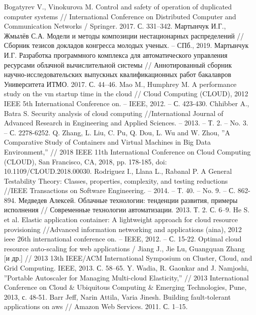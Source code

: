 \begin{thebibliography}{40}
Bogatyrev V., Vinokurova M. Control and safety of operation of duplicated computer systems // International Conference on Distributed Computer and Communication Networks / Springer. 2017. С. 331–342.
Мартынчук И.Г., Жмылёв С.А. Модели и методы композиции нестационарных распределений // Сборник тезисов докладов конгресса молодых ученых. – СПб., 2019.
Мартынчук И.Г. Разработка программного комплекса для автоматического управления ресурсами облачной вычислительной системы // Аннотированный сборник научно-исследовательских выпускных квалификационных работ бакалавров Университета ИТМО. 2017. С. 44–46.
Mao M., Humphrey M. A performance study on the vm startup time in the cloud // Cloud Computing (CLOUD), 2012 IEEE 5th International Conference on. – IEEE, 2012. – С. 423-430.
Chhibber A., Batra S. Security analysis of cloud computing //International Journal of Advanced Research in Engineering and Applied Sciences. – 2013. – Т. 2. – No. 3. – С. 2278-6252.
Q. Zhang, L. Liu, C. Pu, Q. Dou, L. Wu and W. Zhou, ''A Comparative Study of Containers and Virtual Machines in Big Data Environment,'' // 2018 IEEE 11th International Conference on Cloud Computing (CLOUD), San Francisco, CA, 2018, pp. 178-185, doi: 10.1109/CLOUD.2018.00030.
Rodriguez I., Llana L., Rabanal P. A General Testability Theory: Classes, properties, complexity, and testing reductions //IEEE Transactions on Software Engineering. – 2014. – Т. 40. – No. 9. – С. 862-894.
Медведев Алексей. Облачные технологии: тенденции развития, примеры исполнения // Современные технологии автоматизации. 2013. Т. 2. С. 6–9.
He S. et al. Elastic application container: A lightweight approach for cloud resource provisioning //Advanced information networking and applications (aina), 2012 ieee 26th international conference on. – IEEE, 2012. – С. 15-22.
Optimal cloud resource auto-scaling for web applications / Jiang J., Jie Lu, Guangquan Zhang [и др.] // 2013 13th IEEE/ACM International Symposium on Cluster, Cloud, and Grid Computing. IEEE, 2013. С. 58–65.
Y. Wadia, R. Gaonkar and J. Namjoshi, ''Portable Autoscaler for Managing Multi-cloud Elasticity,'' // 2013 International Conference on Cloud \& Ubiquitous Computing \& Emerging Technologies, Pune, 2013, с. 48-51.
Barr Jeff, Narin Attila, Varia Jinesh. Building fault-tolerant applications on aws // Amazon Web Services. 2011. С. 1–15.

\end{thebibliography}
